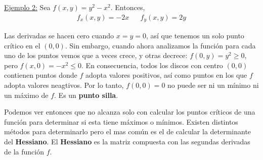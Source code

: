 \documentclass[12pt]{article}
\begin{document}
\underline{Ejemplo 2:} Sea $ f(x,y)=y^2-x^2 $. Entonces,
\begin{align*}
	f_{x}(x,y) = -2x && f_{y}(x,y)  = 2y
\end{align*}

Las derivadas se hacen cero cuando $ x = y = 0 $, así que tenemos un solo punto crítico en el $ (0,0) $. Sin embargo, cuando ahora analizamos la función para cada uno de los puntos vemos que a veces crece, y otras decrece: $ f(0,y)=y^2 \geq 0 $, pero $ f(x,0)=-x^2 \leq 0 $. En consecuencia, todos los discos con centro $ (0,0) $ contienen puntos donde $ f $ adopta valores positivos, así como puntos en los que $ f $ adopta valores neagtivos. Por lo tanto, $ f(0,0)=0 $ no puede ser ni un mínimo ni un máximo de $ f $. Es un \textbf{punto silla}.

\begin{center}
\end{center}

Podemos ver entonces que no alcanza solo con calcular los puntos críticos de una función para determinar si esta tiene máximos o mínimos. Existen distintos métodos para determinarlo pero el mas común es el de calcular la determinante del \textbf{Hessiano}. El \textbf{Hessiano} es la matriz compuesta con las segundas derivadas de la función $ f $.

\vspace{0.2cm}
\vspace{0.2cm}
\end{document}
